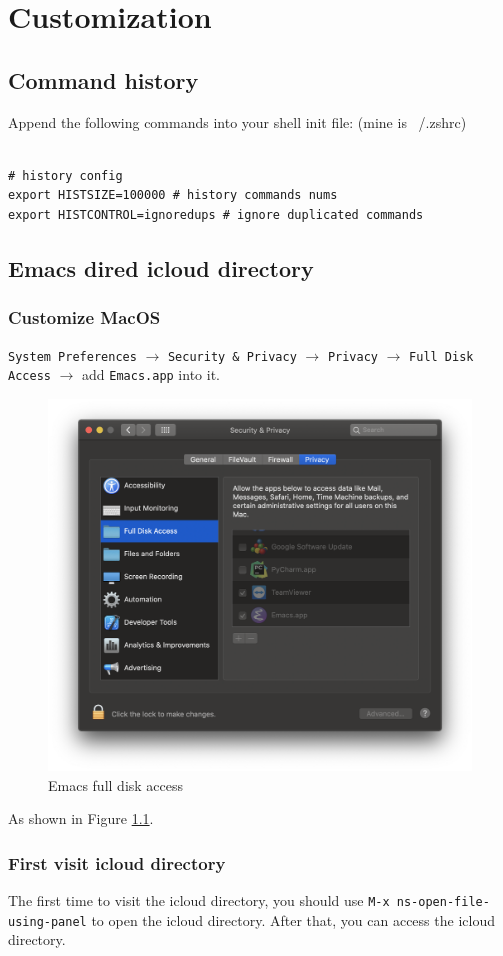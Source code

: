 
\chapter{Customization}

\section{Command history}

Append the following commands into your shell init file: (mine is ~/.zshrc)


\lstset{language=Sh}
\begin{lstlisting}
  
# history config
export HISTSIZE=100000 # history commands nums
export HISTCONTROL=ignoredups # ignore duplicated commands

\end{lstlisting}



\section{Emacs dired icloud directory}

\subsection{Customize MacOS}

\verb|System Preferences| $\rightarrow$
\verb|Security & Privacy| $\rightarrow$
\verb|Privacy| $\rightarrow$
\verb|Full Disk Access| $\rightarrow$
add \verb|Emacs.app| into it.

\begin{figure}[!ht]
  \centering
  \includegraphics[width=\textwidth]{pics/emacs-full-disk-access}
  \caption{Emacs full disk access}
  \label{fig:emacs-full-disk-access}
\end{figure}

As shown in Figure \ref{fig:emacs-full-disk-access}.


\subsection{First visit icloud directory}

The first time to visit the icloud directory, you should use
\verb|M-x ns-open-file-using-panel| to open the icloud directory.
After that, you can access the icloud directory.
